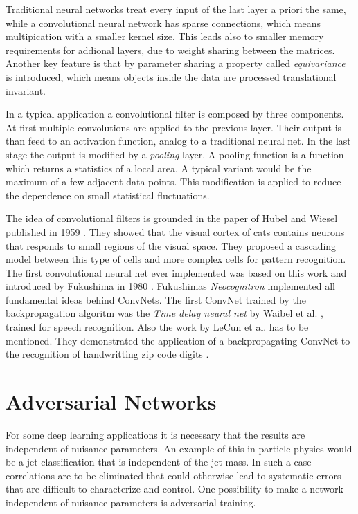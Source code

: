 \documentclass[12pt, a4paper]{thesis}
\begin{document}
Traditional neural networks treat every input of the last layer a
priori the same, while a convolutional neural network has sparse
connections, which means multipication with a smaller kernel
size. This leads also to smaller memory requirements for addional
layers, due to weight sharing between the matrices.  Another key
feature is that by parameter sharing a property called
\emph{equivariance} is introduced, which means objects inside the data
are processed translational invariant.

In a typical application a convolutional filter is composed by three
components.  At first multiple convolutions are applied to the
previous layer. Their output is than feed to an activation function,
analog to a traditional neural net.  In the last stage the output is
modified by a \emph{pooling} layer. A pooling function is a function
which returns a statistics of a local area. A typical variant would be
the maximum of a few adjacent data points. This modification is
applied to reduce the dependence on small statistical fluctuations.

The idea of convolutional filters is grounded in the paper of Hubel
and Wiesel published in 1959 \cite{hubel59}. They showed that the
visual cortex of cats contains neurons that responds to small regions
of the visual space. They proposed a cascading model between this type
of cells and more complex cells for pattern recognition. The first
convolutional neural net ever implemented was based on this work and
introduced by Fukushima in 1980 \cite{neocognitron}. Fukushimas
\emph{Neocognitron} implemented all fundamental ideas behind ConvNets.
The first ConvNet trained by the backpropagation algoritm was the
\emph{Time delay neural net} by Waibel et
al. \cite{hampshire89,waibel90}, trained for speech recognition. Also
the work by LeCun et al. has to be mentioned. They demonstrated the
application of a backpropagating ConvNet to the recognition of
handwritting zip code digits \cite{lecun89}.

\section{Adversarial Networks}

For some deep learning applications it is necessary that the results
are independent of nuisance parameters. An example of this in particle
physics would be a jet classification that is independent of the jet
mass. In such a case correlations are to be eliminated that could
otherwise lead to systematic errors that are difficult to characterize
and control. One possibility to make a network independent of nuisance
parameters is adversarial training.
\end{document}
